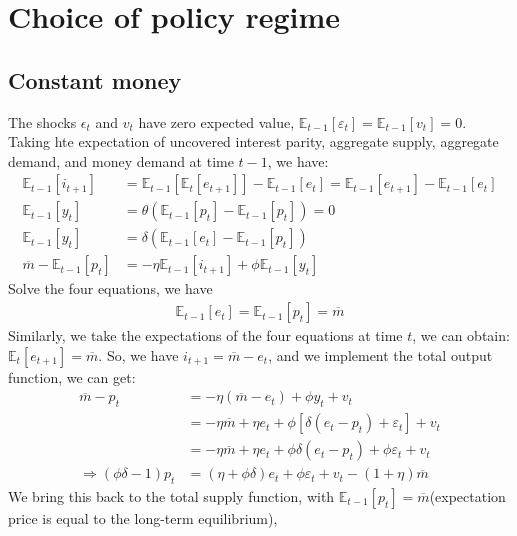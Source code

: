\documentclass[a4paper,12pt]{article} %
\theoremstyle{nonitalic}
\begin{document}
\section{Choice of policy regime}

\subsection{Constant money}

The shocks $\epsilon_t$ and $v_t$ have zero expected value, $\mathbb{E}_{t-1}[\varepsilon_t] = \mathbb{E}_{t-1}[v_t] = 0$.
Taking hte expectation of uncovered interest parity, aggregate supply, aggregate demand, and money demand at time $t-1$, we have:
\begin{align*}
    \mathbb{E}_{t-1}[i_{t+1}] &= \mathbb{E}_{t-1}[\mathbb{E}_t[e_{t+1}]] - \mathbb{E}_{t-1}[e_t] = \mathbb{E}_{t-1}[e_{t+1}] - \mathbb{E}_{t-1}[e_t] \\
    \mathbb{E}_{t-1}[y_t] &= \theta \left( \mathbb{E}_{t-1}[p_t] - \mathbb{E}_{t-1}[p_t] \right) = 0 \\
    \mathbb{E}_{t-1}[y_t] &= \delta (\mathbb{E}_{t-1} [e_t] - \mathbb{E}_{t-1}[p_t]) \\
    \overline{m} - \mathbb{E}_{t-1}[p_t] &= -\eta \mathbb{E}_{t-1}[i_{t+1}] + \phi \mathbb{E}_{t-1}[y_t]    
\end{align*}
Solve the four equations, we have
\begin{gather*}
    \mathbb{E}_{t-1}[e_t] = \mathbb{E}_{t-1}[p_t] = \overline{m}
\end{gather*}
Similarly, we take the expectations of the four equations at time $t$, we can obtain: $\mathbb{E}_t[e_{t+1}] = \overline{m}$.
So, we have $i_{t+1} = \overline{m} - e_t$, and we implement the total output function, we can get:
\begin{align*}
    \overline{m} - p_t &= -\eta (\overline{m} - e_t) + \phi y_t + v_t \\
                       &= -\eta \overline{m} + \eta e_t + \phi \left[\delta (e_t - p_t) + \varepsilon_t\right] + v_t \\
                       &= -\eta \overline{m} + \eta e_t + \phi \delta (e_t - p_t) + \phi \varepsilon_t + v_t \\
    \Rightarrow  (\phi \delta - 1)p_t &= (\eta + \phi \delta )e_t + \phi \varepsilon_t + v_t - (1 + \eta)\overline{m} \tag{2.1.1}
\end{align*}
We bring this back to the total supply function, with $\mathbb{E}_{t-1}[p_t] = \overline{m}$(expectation price is equal to the long-term equilibrium),
\end{document}
